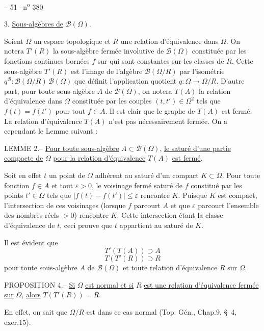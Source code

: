 \begin{center}-- 51 --\hfill n\textsuperscript{o} 380\end{center}
3. \uline{Sous-algèbres de} $\mathcal B(\Omega)$.

Soient $\Omega$ un espace topologique et $R$ une relation d'équivalence dans $\Omega$. On notera $T'(R)$ la sous-algèbre fermée involutive de $\mathcal B(\Omega)$ constituée par les fonctions continues bornées $f$ sur \qquad qui sont constantes sur les classes de $R$. Cette sous-algèbre $T'(R)$ est l'image de l'algèbre $\mathcal B(\Omega/R)$ par l'isométrie $q^{\mathcal B}:\mathcal B(\Omega/R)\,\mathcal B(\Omega)$ que définit l'application quotient $q:\Omega\longrightarrow\Omega/R$. D'autre part, pour toute sous-algèbre $A$ de $\mathcal B(\Omega)$, on notera $T(A)$ la relation d'équivalence dans $\Omega$ constituée par les couples $(t,t')\in\Omega^2$ tels que $f(t)=f(t')$ pour tout $f\in A$. Il est clair que le graphe de $T(A)$ est fermé. La relation d'équivalence $T(A)$ n'est pas nécessairement fermée. On a cependant le Lemme suivant :

LEMME 2.-- \uline{Pour toute sous-algèbre} $A\subset\mathcal B(\Omega)$, \uline{le saturé d'une partie compacte de} $\Omega$ \uline{pour la relation d'équivalence} $T(A)$ \uline{est fermé}.

Soit en effet $t$ un point de $\Omega$ adhérent au saturé d'un compact $K\subset\Omega$. Pour toute fonction $f\in A$ et tout $\varepsilon>0$, le voisinage fermé saturé de $f$ constitué par les points $t'\in\Omega$ tels que $|f(t)-f(t')|\leq\varepsilon$ rencontre $K$. Puisque $K$ est compact, l'intersection de ces voisinages (lorsque $f$ parcourt $A$ et que $\varepsilon$ parcourt l'ensemble des nombres réels $>0$) rencontre $K$. Cette intersection étant la classe d'équivalence de $t$, ceci prouve que $t$ appartient au saturé de $K$.

Il est évident que
\[
T'(T(A))\supset A
\]
\[
T(T'(R))\supset R
\]
pour toute sous-algèbre $A$ de $\mathcal B(\Omega)$ et toute relation d'équivalence $R$ sur $\Omega$.

PROPOSITION 4.-- \uline{Si} $\Omega$ \uline{est normal et si} $R$ \uline{est une relation d'équivalence fermée sur} $\Omega$, \uline{alors} $T(T'(R))=R$.

En effet, on sait que $\Omega/R$ est dans ce cas normal (Top. Gén., Chap.9, \S\ 4, exer.15).
